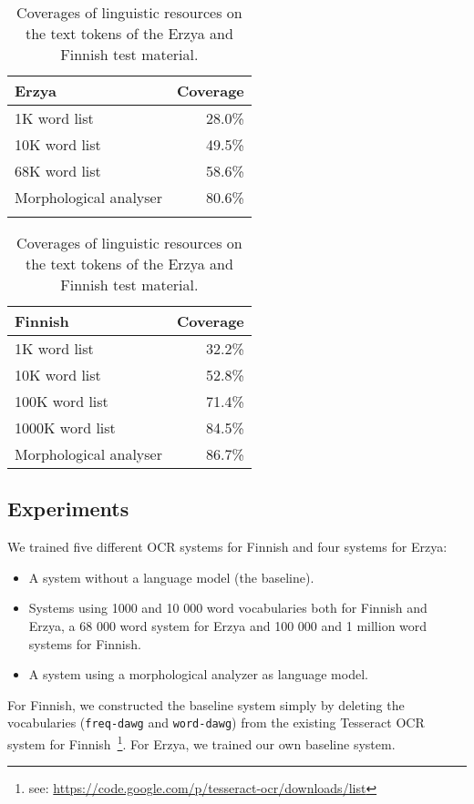\documentclass[b5paper]{article}
\begin{document}
\begin{table}[!htb]
\begin{center}
\begin{tabular}{lr}
\hline 
Erzya                   & Coverage  \\
\hline 
1K word list            &   28.0\%  \\
10K word list           &   49.5\%  \\
68K word list           &   58.6\%  \\
Morphological analyser  &   80.6\%  \\
                        &
\end{tabular}
\quad
\begin{tabular}{lr}
\hline 
Finnish                 & Coverage \\
\hline 
1K word list            &  32.2\% \\
10K word list           &  52.8\% \\
100K word list          &  71.4\% \\
1000K word list         &  84.5\% \\
Morphological analyser  &  86.7\% 
\end{tabular}
\caption{Coverages of linguistic resources on the text tokens of the Erzya and Finnish test
  material.}\label{fin-myv-coverage}
\end{center}
\end{table}

\subsection{Experiments}
We trained five different OCR systems for Finnish and four systems for Erzya:
\begin{itemize}
\item A system without a language model (the baseline).
\item Systems using 1000 and 10 000 word vocabularies both for Finnish
  and Erzya, a 68 000 word system for Erzya and 100 000 and 1 million
  word systems for Finnish.
\item A system using a morphological analyzer as language model.
\end{itemize}

For Finnish, we constructed the baseline system simply by deleting the
vocabularies ({\tt freq-dawg} and {\tt word-dawg}) from the existing
Tesseract OCR system for Finnish~\footnote{see:
  \url{https://code.google.com/p/tesseract-ocr/downloads/list}}. For
Erzya, we trained our own baseline system.
\end{document}
